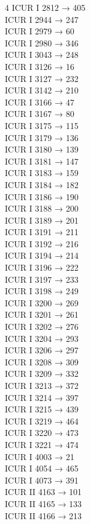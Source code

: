 \begin{multicols}{4}
ICUR I 2812 → 405\\
ICUR I 2944 → 247\\
ICUR I 2979 → 60\\
ICUR I 2980 → 346\\
ICUR I 3043 → 248\\
ICUR I 3126 → 16\\
ICUR I 3127 → 232\\
ICUR I 3142 → 210\\
ICUR I 3166 → 47\\
ICUR I 3167 → 80\\
ICUR I 3175 → 115\\
ICUR I 3179 → 136\\
ICUR I 3180 → 139\\
ICUR I 3181 → 147\\
ICUR I 3183 → 159\\
ICUR I 3184 → 182\\
ICUR I 3186 → 190\\
ICUR I 3188 → 200\\
ICUR I 3189 → 201\\
ICUR I 3191 → 211\\
ICUR I 3192 → 216\\
ICUR I 3194 → 214\\
ICUR I 3196 → 222\\
ICUR I 3197 → 233\\
ICUR I 3198 → 249\\
ICUR I 3200 → 269\\
ICUR I 3201 → 261\\
ICUR I 3202 → 276\\
ICUR I 3204 → 293\\
ICUR I 3206 → 297\\
ICUR I 3208 → 309\\
ICUR I 3209 → 332\\
ICUR I 3213 → 372\\
ICUR I 3214 → 397\\
ICUR I 3215 → 439\\
ICUR I 3219 → 464\\
ICUR I 3220 → 473\\
ICUR I 3221 → 474\\
ICUR I 4003 → 21\\
ICUR I 4054 → 465\\
ICUR I 4073 → 391\\
ICUR II 4163 → 101\\
ICUR II 4165 → 133\\
ICUR II 4166 → 213\\

\end{multicols}
